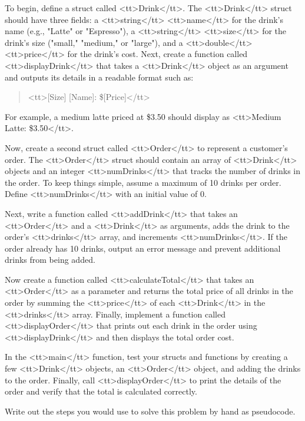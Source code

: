 {{{{{{{To begin, define a struct called <tt>Drink</tt>. The <tt>Drink</tt> struct should have three fields: a <tt>string</tt> <tt>name</tt> for the drink’s name (e.g., "Latte" or "Espresso"), a <tt>string</tt> <tt>size</tt> for the drink’s size ("small," "medium," or "large"), and a <tt>double</tt> <tt>price</tt> for the drink’s cost. Next, create a function called <tt>displayDrink</tt> that takes a <tt>Drink</tt> object as an argument and outputs its details in a readable format such as:

\begin{quote}
<tt>[Size] [Name]: \$[Price]</tt>
\end{quote}

For example, a medium latte priced at \$3.50 should display as <tt>Medium Latte: \$3.50</tt>.

Now, create a second struct called <tt>Order</tt> to represent a customer’s order. The <tt>Order</tt> struct should contain an array of <tt>Drink</tt> objects and an integer <tt>numDrinks</tt> that tracks the number of drinks in the order. To keep things simple, assume a maximum of 10 drinks per order. Define <tt>numDrinks</tt> with an initial value of 0.

Next, write a function called <tt>addDrink</tt> that takes an <tt>Order</tt> and a <tt>Drink</tt> as arguments, adds the drink to the order’s <tt>drinks</tt> array, and increments <tt>numDrinks</tt>. If the order already has 10 drinks, output an error message and prevent additional drinks from being added.

Now create a function called <tt>calculateTotal</tt> that takes an <tt>Order</tt> as a parameter and returns the total price of all drinks in the order by summing the <tt>price</tt> of each <tt>Drink</tt> in the <tt>drinks</tt> array. Finally, implement a function called <tt>displayOrder</tt> that prints out each drink in the order using <tt>displayDrink</tt> and then displays the total order cost.

In the <tt>main</tt> function, test your structs and functions by creating a few <tt>Drink</tt> objects, an <tt>Order</tt> object, and adding the drinks to the order. Finally, call <tt>displayOrder</tt> to print the details of the order and verify that the total is calculated correctly.

\begin{multipart}
    Write out the steps you would use to solve this problem by hand as pseudocode.
\end{multipart}

}}}}}}}
